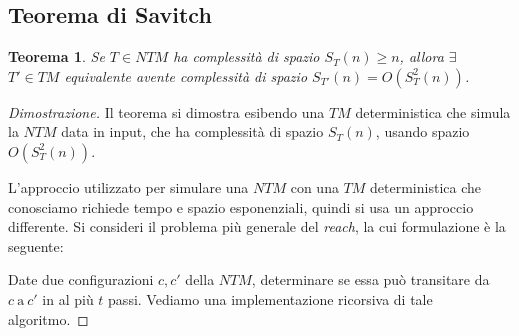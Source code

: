 \subsection{Teorema di Savitch}
\newtheorem*{thm}{Teorema}
\begin{thm} 
Se $T \in NTM$ ha complessità di spazio $S_{T}(n)\geq n$, allora $\exists$ $T' \in TM$ equivalente avente complessità di spazio $S_{T'}(n)=O(S^{2}_{T}(n))$. \\
\end{thm}
\begin{proof}[Dimostrazione]
Il teorema si dimostra esibendo una $TM$ deterministica che simula la $NTM$ data in input, che ha complessità di spazio $S_{T}(n)$, usando spazio $O(S^{2}_{T}(n))$.

L'approccio utilizzato per simulare una $NTM$ con una $TM$ deterministica che conosciamo richiede tempo e spazio esponenziali, quindi si usa un approccio differente. Si consideri il problema più generale del \emph{reach}, la cui formulazione è la seguente:

Date due configurazioni $c, c'$ della $NTM$, determinare se essa può transitare da  $c \  \text{a} \ c'$ in al più $t$ passi. Vediamo una implementazione ricorsiva di tale algoritmo.

\end{proof}
